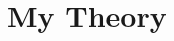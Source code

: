 \documentclass{ctexart}
\begin{document}





















\section{My Theory}

\newpage

\printbibliography
\end{document}
